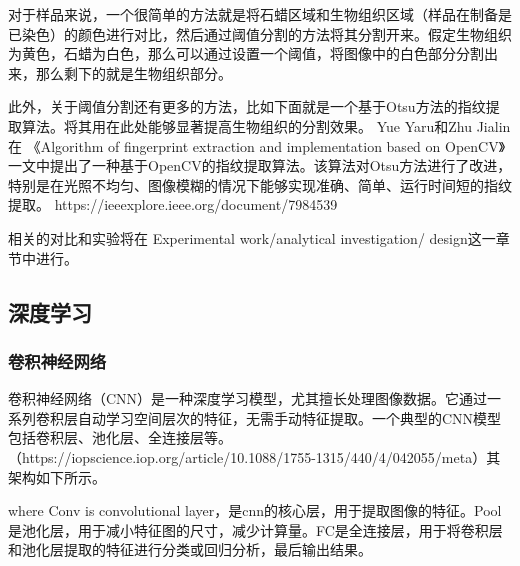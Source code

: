 对于样品来说，一个很简单的方法就是将石蜡区域和生物组织区域（样品在制备是已染色）的颜色进行对比，然后通过阈值分割的方法将其分割开来。假定生物组织为黄色，石蜡为白色，那么可以通过设置一个阈值，将图像中的白色部分分割出来，那么剩下的就是生物组织部分。

此外，关于阈值分割还有更多的方法，比如下面就是一个基于Otsu方法的指纹提取算法。将其用在此处能够显著提高生物组织的分割效果。
Yue Yaru和Zhu Jialin 在 《Algorithm of fingerprint extraction and implementation based on OpenCV》一文中提出了一种基于OpenCV的指纹提取算法。该算法对Otsu方法进行了改进，特别是在光照不均匀、图像模糊的情况下能够实现准确、简单、运行时间短的指纹提取。
https://ieeexplore.ieee.org/document/7984539

相关的对比和实验将在 Experimental work/analytical investigation/ design这一章节中进行。

\subsection{深度学习}

\subsubsection{卷积神经网络}

卷积神经网络（CNN）是一种深度学习模型，尤其擅长处理图像数据。它通过一系列卷积层自动学习空间层次的特征，无需手动特征提取。一个典型的CNN模型包括卷积层、池化层、全连接层等。（https://iopscience.iop.org/article/10.1088/1755-1315/440/4/042055/meta）其架构如下所示。



where Conv is convolutional layer，是cnn的核心层，用于提取图像的特征。Pool是池化层，用于减小特征图的尺寸，减少计算量。FC是全连接层，用于将卷积层和池化层提取的特征进行分类或回归分析，最后输出结果。


